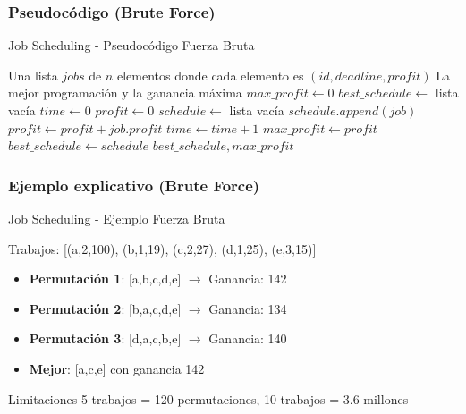 \documentclass[aspectratio=169]{beamer}
\renewcommand{\algorithmicrequire}{\textbf{Entrada:}}
\renewcommand{\algorithmicensure}{\textbf{Salida:}}
\newcommand{\REQUIRE}{\State[\algorithmicrequire]}
\newcommand{\ENSURE}{\State[\algorithmicensure]}
\begin{document}
\subsubsection{Pseudocódigo (Brute Force)}
\begin{frame}[fragile]{Job Scheduling - Pseudocódigo Fuerza Bruta}
\scriptsize
\begin{algorithmic}[1]
\REQUIRE Una lista $jobs$ de $n$ elementos donde cada elemento es $(id, deadline, profit)$
\ENSURE La mejor programación y la ganancia máxima
\State $max\_profit \leftarrow 0$
\State $best\_schedule \leftarrow$ lista vacía
    \State $time \leftarrow 0$ 
    \State $profit \leftarrow 0$ 
    \State $schedule \leftarrow$ lista vacía 
         
            \State $schedule.append(job)$
            \State $profit \leftarrow profit + job.profit$
            \State $time \leftarrow time + 1$
        \EndIf
    \EndFor
        \State $max\_profit \leftarrow profit$
        \State $best\_schedule \leftarrow schedule$
    \EndIf
\EndFor
\Return $best\_schedule, max\_profit$
\end{algorithmic}
\normalsize
\end{frame}

\subsubsection{Ejemplo explicativo (Brute Force)}
\begin{frame}{Job Scheduling - Ejemplo Fuerza Bruta}
\begin{exampleblock}{Trabajos: [(a,2,100), (b,1,19), (c,2,27), (d,1,25), (e,3,15)]}
\begin{itemize}
\item \textbf{Permutación 1}: [a,b,c,d,e] $\rightarrow$ Ganancia: 142
\item \textbf{Permutación 2}: [b,a,c,d,e] $\rightarrow$ Ganancia: 134
\item \textbf{Permutación 3}: [d,a,c,b,e] $\rightarrow$ Ganancia: 140
\item \textbf{Mejor}: [a,c,e] con ganancia 142
\end{itemize}
\end{exampleblock}

\begin{alertblock}{Limitaciones}
5 trabajos = 120 permutaciones, 10 trabajos = 3.6 millones
\end{alertblock}
\end{frame}
\end{document}
